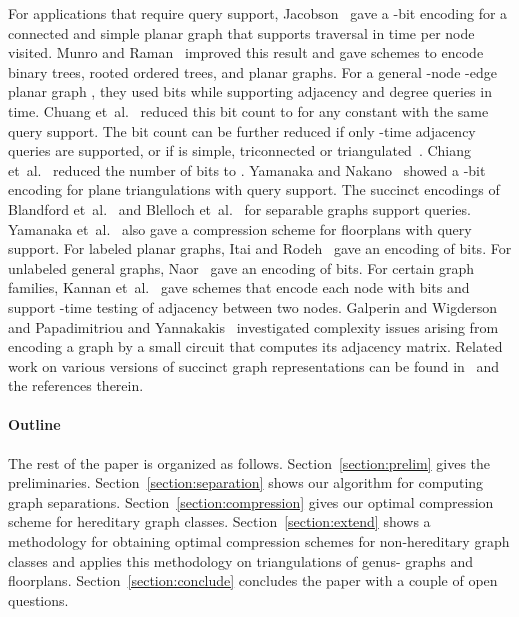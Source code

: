\documentclass[12pt]{article}
\begin{document}
For applications that require query support,
Jacobson~\cite{Jacobson89} gave a -bit encoding for a
connected and simple planar graph  that supports traversal in
 time per node visited. Munro and
Raman~\cite{MunroR97} improved this result and gave schemes to encode
binary trees, rooted ordered trees, and planar graphs. For a general
-node -edge planar graph , they used  bits while
supporting adjacency and degree queries in  time. Chuang
et~al.~\cite{ChuangGHKL98} reduced this bit count to
 for any constant  with the same query
support. The bit count can be further reduced if only -time
adjacency queries are supported, or if  is simple, triconnected or
triangulated~\cite{ChuangGHKL98}.  Chiang et~al.~\cite{ChiangLL05}
reduced the number of bits to .  Yamanaka and
Nakano~\cite{YamanakaN10} showed a -bit encoding for plane
triangulations with query support.  The succinct encodings of Blandford
et~al.~\cite{BlandfordBK03} and Blelloch et~al.~\cite{BlellochF10} for
separable graphs support queries.  Yamanaka et~al.~\cite{YamanakaN08}
also gave a compression scheme for floorplans with query support.
For labeled planar graphs, Itai and Rodeh~\cite{ItaiR82} gave an
encoding of  bits.  For unlabeled general
graphs, Naor~\cite{Naor90} gave an encoding of 
bits.
For certain graph families, Kannan et~al.~\cite{KNR92} gave schemes
that encode each node with  bits and support -time testing of adjacency between two nodes. 
Galperin and Wigderson~\cite{GW83}
and Papadimitriou and Yannakakis~\cite{PH86.encode} investigated
complexity issues arising from encoding a graph by a small circuit
that computes its adjacency matrix.
Related work on various versions of succinct graph representations can
be found
in~\cite{MunroRS01,ArikatiMZ97,FederM95,GrossiL98,GavoilleH:k-page,Patrascu08,SadakaneN10,FarzanRR09,FarzanM08a,FarzanM08b,BarbayAHM07,kaot93.joa}
and the references therein.

\paragraph{Outline}
The rest of the paper is organized as follows.
Section~\ref{section:prelim} gives the preliminaries.
Section~\ref{section:separation} shows our algorithm for computing
graph separations.  Section~\ref{section:compression} gives our
optimal compression scheme for hereditary graph classes.
Section~\ref{section:extend} shows a methodology for obtaining optimal
compression schemes for non-hereditary graph classes and applies this
methodology on triangulations of genus- graphs
and floorplans.  Section~\ref{section:conclude} concludes the paper
with a couple of open questions.
\end{document}
